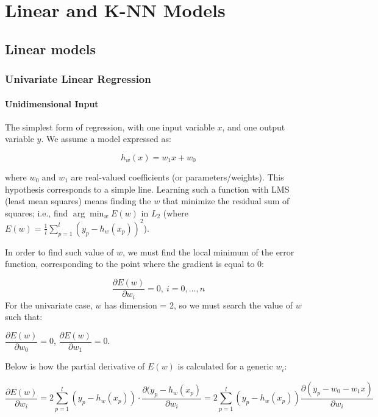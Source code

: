 \chapter{Linear and K-NN Models}

\section{Linear models}

\subsection{Univariate Linear Regression}

\subsubsection{Unidimensional Input}
The simplest form of regression, with one input variable $x$, and one output variable $y$. We assume a model expressed as:

\begin{equation*}
    h_w(x) = w_1 x + w_0
\end{equation*}

where $w_0$ and $w_1$ are real-valued coefficients (or parameters/weights). This hypothesis corresponds to a simple line. Learning such a function with LMS (least mean squares) means finding the $w$ that minimize the residual sum of squares; i.e., find $\arg\min_w E(w)$ in $L_2$ (where $E(w) = \frac{1}{l}\sum_{p=1}^l (y_p - h_w(x_p))^2$).

In order to find such value of $w$, we must find the local minimum of the error function, corresponding to the point where the gradient is equal to 0:

\begin{equation*}
    \dfrac{\partial E(w)}{\partial w_i} = 0, \ i = 0, \dots, n
\end{equation*}
For the univariate case, $w$ has dimension = 2, so we must search the value of $w$ such that:

\begin{center}
    $\dfrac{\partial E(w)}{\partial w_0} = 0$, $\dfrac{\partial E(w)}{\partial w_1} = 0$.
\end{center}
Below is how the partial derivative of $E(w)$ is calculated for a generic $w_i$:

\begin{equation*}
\dfrac{\partial E(w)}{\partial w_i} = 2 \sum_{p=1}^l (y_p - h_w(x_p)) \cdot \dfrac{\partial (y_p - h_w(x_p)}{\partial w_i} = \boxed{2 \sum_{p=1}^l (y_p - h_w(x_p)) \dfrac{\partial (y_p - w_0 - w_1x)}{\partial w_i}}
\end{equation*}

